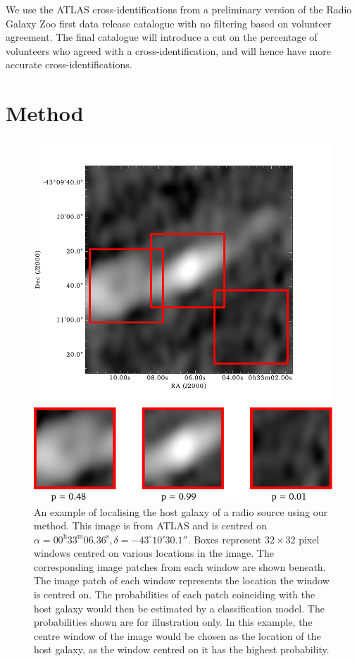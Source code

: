 \documentclass[fleqn,usenatbib,usedcolumn]{mnras}
\begin{document}
    We use the ATLAS cross-identifications from a preliminary version of the
    Radio Galaxy Zoo first data release catalogue with no filtering based on
    volunteer agreement. The final catalogue will introduce a cut on the
    percentage of volunteers who agreed with a cross-identification, and will
    hence have more accurate cross-identifications.

  \section{Method}\label{sec:method}
    \begin{figure}
      \centering
      \includegraphics[width=\columnwidth]{images/elais_0093C1_with_boxes}
      \caption{An example of localising the host galaxy of a radio source using
        our method. This image is from ATLAS and is centred on $\alpha =
        00^\text{h}33^\text{m}06.36^\text{s}, \delta = -43^\circ{}10'30.1''$.
        Boxes represent $32 \times 32$ pixel windows centred on various
        locations in the image. The corresponding image patches from each
        window are shown beneath. The image patch of each window represents
        the location the window is centred on. The probabilities of each patch
        coinciding with the host galaxy would then be estimated by a
        classification model. The probabilities shown are for illustration
        only. In this example, the centre window of the image would be chosen
        as the location of the host galaxy, as the window centred on it has
        the highest probability.}
      \label{fig:windows}
    \end{figure}
    
\end{document}
